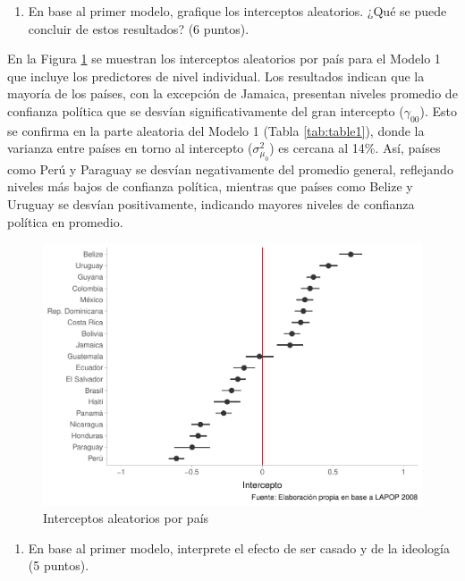 \documentclass[
  12pt,
  a4paper,
]{article}
\providecommand{\tightlist}{%
  \setlength{\itemsep}{0pt}\setlength{\parskip}{0pt}}
\begin{document}
\begin{enumerate}
\def\labelenumi{\alph{enumi})}
\setcounter{enumi}{1}
\tightlist
\item
  En base al primer modelo, grafique los interceptos aleatorios. ¿Qué se puede concluir de estos resultados? (6 puntos).
\end{enumerate}

En la Figura \ref{fig:fig1} se muestran los interceptos aleatorios por país para el Modelo 1 que incluye los predictores de nivel individual. Los resultados indican que la mayoría de los países, con la excepción de Jamaica, presentan niveles promedio de confianza política que se desvían significativamente del gran intercepto (\(\gamma_{00}\)). Esto se confirma en la parte aleatoria del Modelo 1 (Tabla \ref{tab:table1}), donde la varianza entre países en torno al intercepto (\(\sigma^2_{\mu_0}\)) es cercana al 14\%. Así, países como Perú y Paraguay se desvían negativamente del promedio general, reflejando niveles más bajos de confianza política, mientras que países como Belize y Uruguay se desvían positivamente, indicando mayores niveles de confianza política en promedio.

\begin{figure}

{\centering \includegraphics[width=0.8\linewidth]{01-guia_files/figure-latex/fig1-1} 

}

\caption{Interceptos aleatorios por país}\label{fig:fig1}
\end{figure}

\begin{enumerate}
\def\labelenumi{\alph{enumi})}
\setcounter{enumi}{2}
\tightlist
\item
  En base al primer modelo, interprete el efecto de ser casado y de la ideología (5 puntos).
\end{enumerate}
\end{document}
